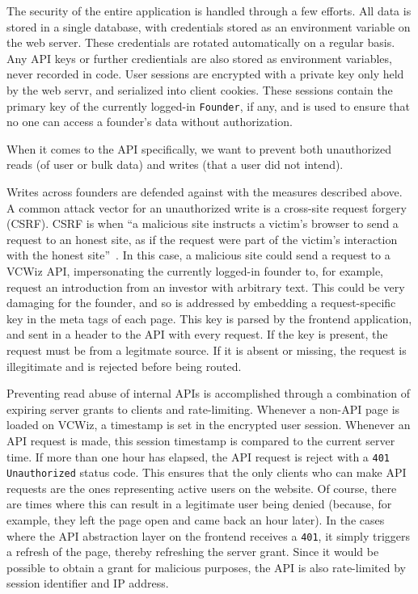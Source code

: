 The security of the entire application is handled through a few efforts. All data is stored in a single database, with credentials stored as an environment variable on the web server. These credentials are rotated automatically on a regular basis. Any API keys or further credientials are also stored as environment variables, never recorded in code. User sessions are encrypted with a private key only held by the web servr, and serialized into client cookies. These sessions contain the primary key of the currently logged-in \texttt{Founder}, if any, and is used to ensure that no one can access a founder's data without authorization.

When it comes to the API specifically, we want to prevent both unauthorized reads (of user or bulk data) and writes (that a user did not intend).

Writes across founders are defended against with the measures described above. A common attack vector for an unauthorized write is a cross-site request forgery (CSRF). CSRF is when ``a malicious site instructs a victim’s browser to send a request to an honest site, as if the request were part of the victim’s interaction with the honest site''~\cite{Barth:2008:RDC:1455770.1455782}. In this case, a malicious site could send a request to a VCWiz API, impersonating the currently logged-in founder to, for example, request an introduction from an investor with arbitrary text. This could be very damaging for the founder, and so is addressed by embedding a request-specific key in the meta tags of each page. This key is parsed by the frontend application, and sent in a header to the API with every request. If the key is present, the request must be from a legitmate source. If it is absent or missing, the request is illegitimate and is rejected before being routed.

Preventing read abuse of internal APIs is accomplished through a combination of expiring server grants to clients and rate-limiting. Whenever a non-API page is loaded on VCWiz, a timestamp is set in the encrypted user session. Whenever an API request is made, this session timestamp is compared to the current server time. If more than one hour has elapsed, the API request is reject with a \texttt{401 Unauthorized} status code. This ensures that the only clients who can make API requests are the ones representing active users on the website. Of course, there are times where this can result in a legitimate user being denied (because, for example, they left the page open and came back an hour later). In the cases where the API abstraction layer on the frontend receives a \texttt{401}, it simply triggers a refresh of the page, thereby refreshing the server grant. Since it would be possible to obtain a grant for malicious purposes, the API is also rate-limited by session identifier and IP address.

